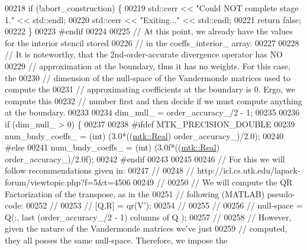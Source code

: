 \begin{DoxyCode}
00218   \textcolor{keywordflow}{if} (!abort\_construction) \{
00219     std::cerr << \textcolor{stringliteral}{"Could NOT complete stage 1."} << std::endl;
00220     std::cerr << \textcolor{stringliteral}{"Exiting..."} << std::endl;
00221     \textcolor{keywordflow}{return} \textcolor{keyword}{false};
00222   \}
00223 \textcolor{preprocessor}{  #endif}
00224 
00225   \textcolor{comment}{// At this point, we already have the values for the interior stencil stored}
00226   \textcolor{comment}{// in the coeffs\_interior\_ array.}
00227 
00228   \textcolor{comment}{// It is noteworthy, that the 2nd-order-accurate divergence operator has NO}
00229   \textcolor{comment}{// approximation at the boundary, thus it has no weights. For this case, the}
00230   \textcolor{comment}{// dimension of the null-space of the Vandermonde matrices used to compute the}
00231   \textcolor{comment}{// approximating coefficients at the boundary is 0. Ergo, we compute this}
00232   \textcolor{comment}{// number first and then decide if we must compute anything at the boundary.}
00233 
00234   dim\_null\_ = order\_accuracy\_/2 - 1;
00235 
00236   \textcolor{keywordflow}{if} (dim\_null\_ > 0) \{
00237 
00238 \textcolor{preprocessor}{    #ifdef MTK\_PRECISION\_DOUBLE}
00239     num\_bndy\_coeffs\_ = (int) (3.0*((\hyperlink{group__c01-roots_gac080bbbf5cbb5502c9f00405f894857d}{mtk::Real}) order\_accuracy\_)/2.0);
00240 \textcolor{preprocessor}{    #else}
00241     num\_bndy\_coeffs\_ = (int) (3.0f*((\hyperlink{group__c01-roots_gac080bbbf5cbb5502c9f00405f894857d}{mtk::Real}) order\_accuracy\_)/2.0f);
00242 \textcolor{preprocessor}{    #endif}
00243 
00245 
00246     \textcolor{comment}{// For this we will follow recommendations given in:}
00247     \textcolor{comment}{//}
00248     \textcolor{comment}{// http://icl.cs.utk.edu/lapack-forum/viewtopic.php?f=5&t=4506}
00249     \textcolor{comment}{//}
00250     \textcolor{comment}{// We will compute the QR Factorization of the transpose, as in the}
00251     \textcolor{comment}{// following (MATLAB) pseudo-code:}
00252     \textcolor{comment}{//}
00253     \textcolor{comment}{// [Q,R] = qr(V'); %
00254     \textcolor{comment}{// %
00255     \textcolor{comment}{//}
00256     \textcolor{comment}{// null-space = Q(:, last (order\_accuracy\_/2 - 1) columns of Q );}
00257     \textcolor{comment}{//}
00258     \textcolor{comment}{// However, given the nature of the Vandermonde matrices we've just}
00259     \textcolor{comment}{// computed, they all posses the same null-space. Therefore, we impose the}
}}
\end{DoxyCode}
